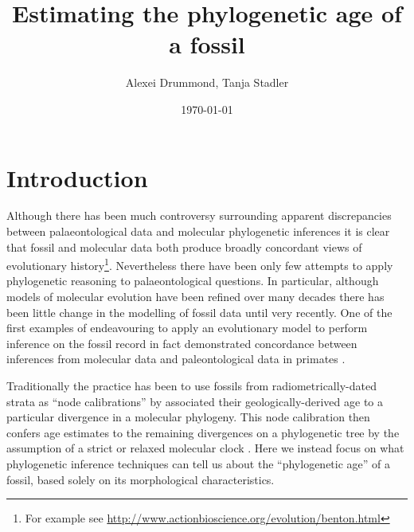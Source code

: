 \documentclass[11pt]{article}
\begin{document}
\title{Estimating the phylogenetic age of a fossil}
\author{Alexei Drummond, Tanja Stadler}
\date{\today{}}
\maketitle

\section*{Introduction}


Although there has been much controversy surrounding apparent discrepancies between palaeontological data and molecular phylogenetic inferences it is clear that fossil and molecular data both produce broadly concordant views of evolutionary history\footnote{For example see \url{http://www.actionbioscience.org/evolution/benton.html}}. Nevertheless there have been only few attempts to apply phylogenetic reasoning to palaeontological questions. In particular, although models of molecular evolution have been refined over many decades \autocite{Felsenstein2004,Yang:2006yu} there has been little change in the modelling of fossil data until very recently. One of the first examples of endeavouring to apply an evolutionary model to perform inference on the fossil record in fact demonstrated concordance between inferences from  molecular data and paleontological data in primates \autocite{tavare2002using}. 

Traditionally the practice has been to use fossils from radiometrically-dated strata as ``node calibrations'' by associated their geologically-derived age to a particular divergence in a molecular phylogeny. This node calibration then confers age estimates to the remaining divergences on a phylogenetic tree by the assumption of a strict or relaxed molecular clock \autocite{Thorne1998,thorne2005,yang2006,Drummond2006}. 
Here we instead focus on what phylogenetic inference techniques can tell us about the ``phylogenetic age'' of a fossil, based solely on its morphological characteristics.
\end{document}
